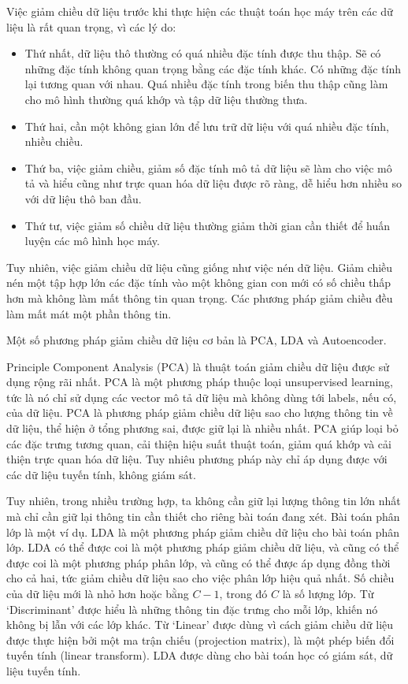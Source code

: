 Việc giảm chiều dữ liệu trước khi thực hiện các thuật toán học máy trên các dữ liệu là rất quan trọng, vì các lý do:
\begin{itemize}
	\item Thứ nhất, dữ liệu thô thường có quá nhiều đặc tính được thu thập. Sẽ có những đặc tính không quan trọng bằng các đặc tính khác. Có những đặc tính lại tương quan với nhau. Quá nhiều đặc tính trong biến thu thập cũng làm cho mô hình thường quá khớp và tập dữ liệu thường thưa.
	\item Thứ hai, cần một không gian lớn để lưu trữ dữ liệu với quá nhiều đặc tính, nhiều chiều.
	\item Thứ ba, việc giảm chiều, giảm số đặc tính mô tả dữ liệu sẽ làm cho việc mô tả và hiểu cũng như trực quan hóa dữ liệu được rõ ràng, dễ hiểu hơn nhiều so với dữ liệu thô ban đầu.
	\item Thứ tư, việc giảm số chiều dữ liệu thường giảm thời gian cần thiết để huấn luyện các mô hình học máy.
	
\end{itemize}
Tuy nhiên, việc giảm chiều dữ liệu cũng giống như việc nén dữ liệu. Giảm chiều nén một tập hợp lớn các đặc tính vào một không gian con mới có số chiều thấp hơn mà không làm mất thông tin quan trọng. Các phương pháp giảm chiều đều làm mất mát một phần thông tin.

Một số phương pháp giảm chiều dữ liệu cơ bản là PCA, LDA và Autoencoder. 

Principle Component Analysis (PCA) là thuật toán giảm chiều dữ liệu được sử dụng rộng rãi nhất.  PCA là một phương pháp thuộc loại unsupervised learning, tức là nó chỉ sử dụng các vector mô tả dữ liệu mà không dùng tới labels, nếu có, của dữ liệu.  PCA là phương pháp giảm chiều dữ liệu sao cho lượng thông tin về dữ liệu, thể hiện ở tổng phương sai, được giữ lại là nhiều nhất. PCA giúp loại bỏ các đặc trưng tương quan, cải thiện hiệu suất thuật toán, giảm quá khớp và cải thiện trực quan hóa dữ liệu. Tuy nhiêu phương pháp này chỉ áp dụng được với các dữ liệu tuyến tính, không giám sát.

Tuy nhiên, trong nhiều trường hợp, ta không cần giữ lại lượng thông tin lớn nhất mà chỉ cần giữ lại thông tin cần thiết cho riêng bài toán đang xét. Bài toán phân lớp là một ví dụ. LDA là một phương pháp giảm chiều dữ liệu cho bài toán phân lớp. LDA có thể được coi là một phương pháp giảm chiều dữ liệu, và cũng có thể được coi là một phương pháp phân lớp, và cũng có thể được áp dụng đồng thời cho cả hai, tức giảm chiều dữ liệu sao cho việc phân lớp hiệu quả nhất. Số chiều của dữ liệu mới là nhỏ hơn hoặc bằng $C-1$, trong đó $C$ là số lượng lớp. Từ ‘Discriminant’ được hiểu là những thông tin đặc trưng cho mỗi lớp, khiến nó không bị lẫn với các lớp khác. Từ ‘Linear’ được dùng vì cách giảm chiều dữ liệu được thực hiện bởi một ma trận chiếu (projection matrix), là một phép biến đổi tuyến tính (linear transform). LDA được dùng cho bài toán học có giám sát, dữ liệu tuyến tính.

